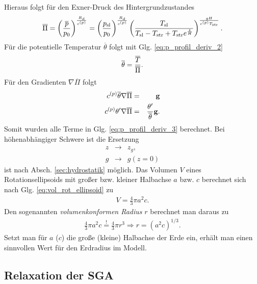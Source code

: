 \documentclass{book}
\newcommand\newoverline[1]{%
\overline{#1}}
\begin{document}
%
Hieraus folgt für den Exner-Druck des Hintergrundzustandes
%
\begin{eqnarray}
\newoverline{\Pi} = \left(\frac{\newoverline{p}}{p_0}\right)^\frac{R_d}{c^{(p)}} = \left(\frac{p_\text{sl}}{p_0}\right)^\frac{R_d}{c^{(p)}}\left(\frac{T_{\text{sl}}}{T_{\text{sl}} - T_{\text{str}} + T_{\text{str}}e^{\frac{z}{H}}}\right)^{\frac{gH}{c^{(p)}T_{\text{str}}}}.
\end{eqnarray}
%
Für die potentielle Temperatur $\newoverline{\theta}$ folgt mit Glg. \eqref{eq:p_profil_deriv_2}
%
\begin{eqnarray}
\newoverline{\theta} = \frac{\newoverline{T}}{\newoverline{\Pi}}.
\end{eqnarray}
%
Für den Gradienten $\nabla\newoverline{\Pi}$ folgt
%
\begin{eqnarray}
c^{(p)}\newoverline{\theta}\nabla\newoverline{\Pi} & = & \mathbf{g}\nonumber\\
c^{(p)}\theta'\nabla\newoverline{\Pi} & = & \frac{\theta'}{\newoverline{\theta}}\mathbf{g}.
\end{eqnarray}
%
Somit wurden alle Terme in Glg. \eqref{eq:p_profil_deriv_3} berechnet. Bei höhenabhängiger Schwere ist die Ersetzung
%
\begin{eqnarray}
z & \to & z_g,\\
g & \to & g\left(z = 0\right)
\end{eqnarray}
%
ist nach Absch. \ref{sec:hydrostatik} möglich. Das Volumen $V$ eines Rotationsellipsoids mit großer bzw. kleiner Halbachse $a$ bzw. $c$ berechnet sich nach Glg.  \eqref{eq:vol_rot_ellipsoid} zu
%
\begin{eqnarray}
V = \frac{4}{3}\pi a^2c.
\end{eqnarray}
%
Den sogenannten \textit{volumenkonformen Radius} $r$ berechnet man daraus zu
%
\begin{eqnarray}
\frac{4}{3}\pi a^2c \stackrel{!}{=} \frac{4}{3}\pi r^3 \Rightarrow r = \left(a^2c\right)^{1/3}.
\end{eqnarray}
%
Setzt man für $a$ ($c$) die große (kleine) Halbachse der Erde ein, erhält man einen sinnvollen Wert für den Erdradius im Modell.

\subsection{Relaxation der SGA}
\label{sec:relaxation_der_sga}
\end{document}

